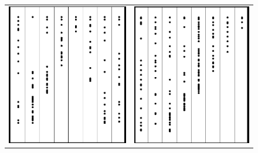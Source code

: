 \documentclass[a4paper, 11pt]{article}
\begin{document}
\begin{figure}[H]
\begin{center}
\begin{tabular}{c c}
\includegraphics[scale=0.125]{Images/4By8MidTriOne.png} & \includegraphics[scale=0.125]{Images/3By8LeftOne.png}

\end{tabular}
\end{center}
\end{figure}
\end{document}
